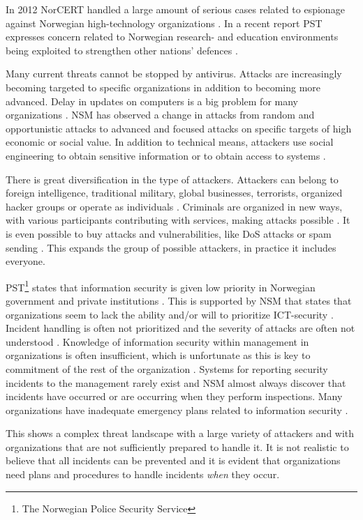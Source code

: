 In 2012 \acs{NorCERT} handled a large amount of serious cases related to espionage against Norwegian high-technology organizations \cite{NorCERT3Kvartal2012}. In a recent report PST expresses concern related to Norwegian research- and education environments being exploited to strengthen other nations' defences \cite{PSTvurdering2013}.   

Many current threats cannot be stopped by antivirus. Attacks are increasingly becoming targeted to specific organizations in addition to becoming more advanced. Delay in updates on computers is a big problem for many organizations \cite{NorCERT2Kvartal2012}. \acs{NSM} has observed a change in attacks from random and opportunistic attacks to advanced and focused attacks on specific targets of high economic or social value. In addition to technical means, attackers use social engineering to obtain sensitive information or to obtain access to systems \cite{NSMRapport}.  

There is great diversification in the type of attackers. Attackers can belong to foreign intelligence, traditional military, global businesses, terrorists, organized hacker groups or operate as individuals \cite{samordnaVurdering}. Criminals are organized in new ways, with various participants contributing with services, making attacks possible \cite{KriposTrender}. It is even possible to buy attacks and vulnerabilities, like \ac{DoS} attacks or spam sending \cite{NorCERT2Kvartal2012}. This expands the group of possible attackers, in practice it includes everyone. 

PST\footnote{The Norwegian Police Security Service} states that information security is given low priority in Norwegian government and private institutions \cite{PSTvurdering}. This is supported by \acs{NSM} that states that organizations seem to lack the ability and/or will to prioritize ICT-security \cite{NSMmelding}. Incident handling is often not prioritized and the severity of attacks are often not understood \cite{NorCERT2Kvartal2012}. Knowledge of information security within management in organizations is often insufficient, which is unfortunate as this is key to commitment of the rest of the organization \cite{NorCERT3Kvartal2012}. Systems for reporting security incidents to the management rarely exist and \acs{NSM} almost always discover that incidents have occurred or are occurring when they perform inspections. Many organizations have inadequate emergency plans related to information security \cite{NSMRapport}.

This shows a complex threat landscape with a large variety of attackers and with organizations that are not sufficiently prepared to handle it. It is not realistic to believe that all incidents can be prevented and it is evident that organizations need plans and procedures to handle incidents \textit{when} they occur.

